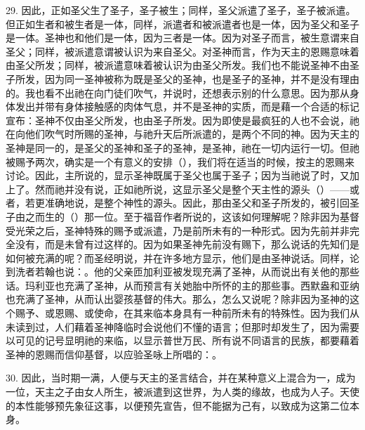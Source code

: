 29. 因此，正如圣父生了圣子，圣子被生；同样，圣父派遣了圣子，圣子被派遣。但正如生者和被生者是一体，同样，派遣者和被派遣者也是一体，因为圣父和圣子是一体。圣神也和他们是一体，因为三者是一体。因为对圣子而言，被生意谓来自圣父；同样，被派遣意谓被认识为来自圣父。对圣神而言，作为天主的恩赐意味着由圣父所发；同样，被派遣意味着被认识为由圣父所发。我们也不能说圣神不由圣子所发，因为同一圣神被称为既是圣父的圣神，也是圣子的圣神，并不是没有理由的。我也看不出祂在向门徒们吹气，并说时，还想表示别的什么意思。因为那从身体发出并带有身体接触感的肉体气息，并不是圣神的实质，而是藉一个合适的标记宣布：圣神不仅由圣父所发，也由圣子所发。因为即使是最疯狂的人也不会说，祂在向他们吹气时所赐的圣神，与祂升天后所派遣的，是两个不同的神。因为天主的圣神是同一的，是圣父的圣神和圣子的圣神，是圣神，祂在一切内运行一切。但祂被赐予两次，确实是一个有意义的安排（），我们将在适当的时候，按主的恩赐来讨论。因此，主所说的，显示圣神既属于圣父也属于圣子；因为当祂说了时，又加上了。然而祂并没有说，正如祂所说，这显示圣父是整个天主性的源头（）——或者，若更准确地说，是整个神性的源头。因此，那由圣父和圣子所发的，被引回圣子由之而生的（）那一位。至于福音作者所说的，这该如何理解呢？除非因为基督受光荣之后，圣神特殊的赐予或派遣，乃是前所未有的一种形式。因为先前并非完全没有，而是未曾有过这样的。因为如果圣神先前没有赐下，那么说话的先知们是如何被充满的呢？而圣经明说，并在许多地方显示，他们是由圣神说话。同样，论到洗者若翰也说：。他的父亲匝加利亚被发现充满了圣神，从而说出有关他的那些话。玛利亚也充满了圣神，从而预言有关她胎中所怀的主的那些事。西默盎和亚纳也充满了圣神，从而认出婴孩基督的伟大。那么，怎么又说呢？除非因为圣神的这个赐予、或恩赐、或使命，在其来临本身具有一种前所未有的特殊性。因为我们从未读到过，人们藉着圣神降临时会说他们不懂的语言；但那时却发生了，因为需要以可见的记号显明祂的来临，以显示普世万民、所有说不同语言的民族，都要藉着圣神的恩赐而信仰基督，以应验圣咏上所唱的：。\par

30. 因此，当时期一满，人便与天主的圣言结合，并在某种意义上混合为一，成为一位，天主之子由女人所生，被派遣到这世界，为人类的缘故，也成为人子。天使的本性能够预先象征这事，以便预先宣告，但不能据为己有，以致成为这第二位本身。\par

